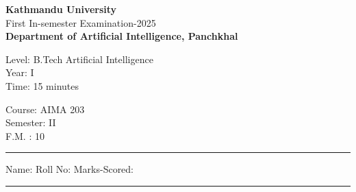 \documentclass[12pt]{exam}
\begin{document}
\begin{center}
  {\bfseries  {\large Kathmandu University}} \\
  First In-semester Examination-2025 \\[-2mm]
    \textbf{\small Department of Artificial Intelligence, Panchkhal}
\end{center}
\vspace{2mm}

\begin{minipage}{0.70\linewidth}
  \begin{flushleft}
    Level: B.Tech Artificial Intelligence \\
    Year: I \\
    Time: 15 minutes
  \end{flushleft}
\end{minipage} \hfill
\begin{minipage}{0.25\linewidth}
  \begin{flushleft}
    Course: AIMA 203 \\
    Semester: II \\
    F.M. : 10
  \end{flushleft}
\end{minipage}
\vspace{-8mm}
\begin{center}
  \rule{\textwidth}{1pt}
  Name: \hspace{5cm}  Roll No: \hspace{3cm} Marks-Scored:
  \vskip -3mm
\rule{\textwidth}{1pt}
\end{center}
\end{document}
